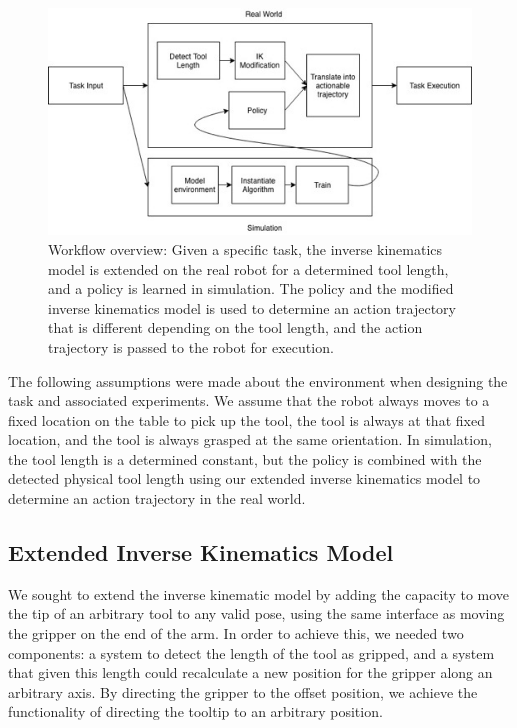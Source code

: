 \documentclass[conference]{IEEEtran}
\begin{document}
\begin{figure}[h!]
\centering
 \includegraphics[scale=0.5]{workflow.jpg}
 \caption{Workflow overview: Given a specific task, the inverse kinematics model is extended on the real robot for a determined tool length, and a policy is learned in simulation. The policy and the modified inverse kinematics model is used to determine an action trajectory that is different depending on the tool length, and the action trajectory is passed to the robot for execution.}
 \label{fig:workflow}
\end{figure} 

The following assumptions were made about the environment when designing the task and associated experiments. We assume that the robot always moves to a fixed location on the table to pick up the tool, the tool is always at that fixed location, and the tool is always grasped at the same orientation. In simulation, the tool length is a determined constant, but the policy is combined with the detected physical tool length using our extended inverse kinematics model to determine an action trajectory in the real world.

\subsection{Extended Inverse Kinematics Model}
We sought to extend the inverse kinematic model by adding the capacity to move the tip of an arbitrary tool to any valid pose, using the same interface as moving the gripper on the end of the arm. In order to achieve this, we needed two components: a system to detect the length of the tool as gripped, and a system that given this length could recalculate a new position for the gripper along an arbitrary axis. By directing the gripper to the offset position, we achieve the functionality of directing the tooltip to an arbitrary position. 
\end{document}
